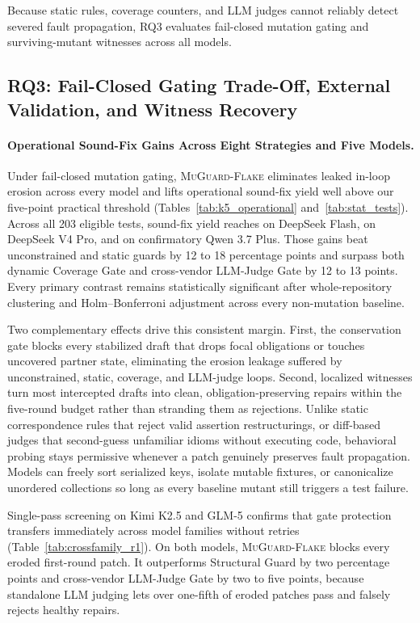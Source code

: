 Because static rules, coverage counters, and LLM judges cannot reliably detect severed fault propagation, RQ3 evaluates fail-closed mutation gating and surviving-mutant witnesses across all models.

\subsection{RQ3: Fail-Closed Gating Trade-Off, External Validation, and Witness Recovery}
\label{sec:rq3}

\paragraph{Operational Sound-Fix Gains Across Eight Strategies and Five Models.}
Under fail-closed mutation gating, \textsc{MuGuard-Flake} eliminates leaked in-loop erosion across every model and lifts operational sound-fix yield well above our five-point practical threshold (Tables~\ref{tab:k5_operational} and~\ref{tab:stat_tests}). Across all 203 eligible tests, sound-fix yield reaches \FlashOursSoundPct{} on DeepSeek Flash, \ProOursSoundPct{} on DeepSeek V4 Pro, and \QwenOursSoundPct{} on confirmatory Qwen 3.7 Plus. Those gains beat unconstrained and static guards by 12 to 18 percentage points and surpass both dynamic Coverage Gate and cross-vendor LLM-Judge Gate by 12 to 13 points. Every primary contrast remains statistically significant after whole-repository clustering and Holm--Bonferroni adjustment across every non-mutation baseline.

Two complementary effects drive this consistent margin. First, the conservation gate blocks every stabilized draft that drops focal obligations or touches uncovered partner state, eliminating the erosion leakage suffered by unconstrained, static, coverage, and LLM-judge loops. Second, localized witnesses turn most intercepted drafts into clean, obligation-preserving repairs within the five-round budget rather than stranding them as rejections. Unlike static correspondence rules that reject valid assertion restructurings, or diff-based judges that second-guess unfamiliar idioms without executing code, behavioral probing stays permissive whenever a patch genuinely preserves fault propagation. Models can freely sort serialized keys, isolate mutable fixtures, or canonicalize unordered collections so long as every baseline mutant still triggers a test failure.



Single-pass screening on Kimi K2.5 and GLM-5 confirms that gate protection transfers immediately across model families without retries (Table~\ref{tab:crossfamily_r1}). On both models, \textsc{MuGuard-Flake} blocks every eroded first-round patch. It outperforms Structural Guard by two percentage points and cross-vendor LLM-Judge Gate by two to five points, because standalone LLM judging lets over one-fifth of eroded patches pass and falsely rejects healthy repairs.

